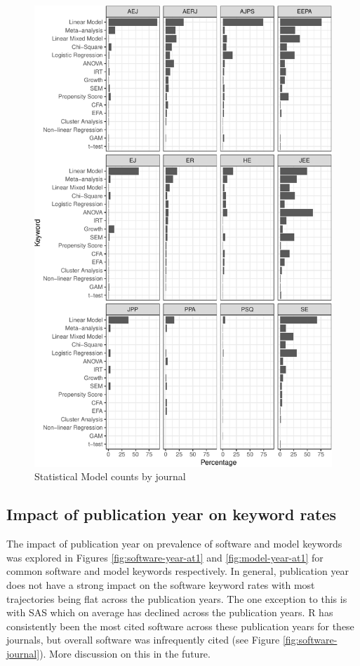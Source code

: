 \documentclass[english,,man]{apa6}
\theoremstyle{definition}
\theoremstyle{definition}
\theoremstyle{definition}
\theoremstyle{remark}
\begin{document}
\begin{figure}
\centering
\includegraphics{software_files/figure-latex/model-journal-1.pdf}
\caption{\label{fig:model-journal}Statistical Model counts by journal}
\end{figure}

\hypertarget{impact-of-publication-year-on-keyword-rates}{%
\subsection{Impact of publication year on keyword
rates}\label{impact-of-publication-year-on-keyword-rates}}

The impact of publication year on prevalence of software and model
keywords was explored in Figures \ref{fig:software-year-at1} and
\ref{fig:model-year-at1} for common software and model keywords
respectively. In general, publication year does not have a strong impact
on the software keyword rates with most trajectories being flat across
the publication years. The one exception to this is with SAS which on
average has declined across the publication years. R has consistently
been the most cited software across these publication years for these
journals, but overall software was infrequently cited (see Figure
\ref{fig:software-journal}). More discussion on this in the future.
\end{document}
